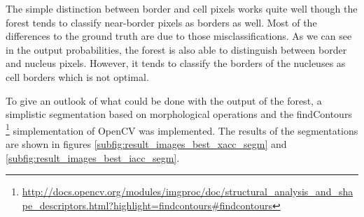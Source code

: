 The simple distinction between border and cell pixels works quite well though the forest
tends to classify near-border pixels as borders as well. Most of the differences to the
ground truth are due to those misclassifications. As we can see in the output probabilities,
the forest is also able to distinguish between border and nucleus pixels. However, it tends
to classify the borders of the nucleuses as cell borders which is not optimal. 

To give an outlook of what could be done with the output of the forest, a simplistic segmentation
based on morphological operations and the findContours
\footnote{\url{http://docs.opencv.org/modules/imgproc/doc/structural_analysis_and_shape_descriptors.html?highlight=findcontours\#findcontours}}
simplementation of OpenCV was implemented.
The results of the segmentations are shown in figures \ref{subfig:result_images_best_xacc_segm}
and \ref{subfig:result_images_best_iacc_segm}. 